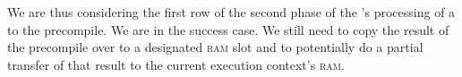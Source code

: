 \begin{center}
\end{center}
We are thus considering the first row of the second phase of the \hubMod{}'s processing of a  to the \instBlake{} precompile.
We are in the success case.
We still need to copy the result of the precompile over to a designated \textsc{ram} slot and to potentially do a partial transfer of that result to the current execution context's \textsc{ram}.
